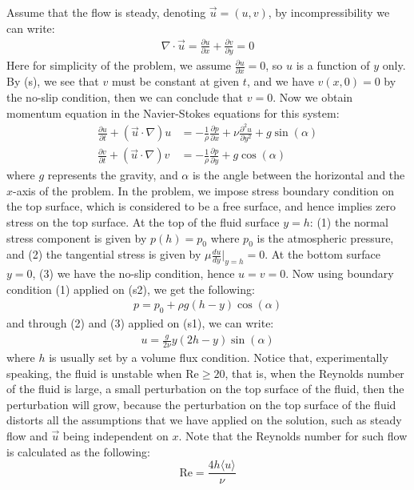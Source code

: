 \documentclass[11pt]{book}
\theoremstyle{break}
\theoremstyle{break}
\begin{document}
Assume that the flow is steady, denoting $\vec{u}=(u,v)$, by incompressibility we can write:
\begin{align*}
\nabla \cdot \vec{u} = \frac{\partial u}{\partial x} + \frac{\partial v}{\partial y}= 0 \tag{s}
\end{align*}
Here for simplicity of the problem, we assume $\frac{\partial u}{\partial x} = 0$, so $u$ is a function of $y$ only. By (s), we see that $v$ must be constant at given $t$, and we have $v(x,0)=0$ by the no-slip condition, then we can conclude that $v = 0$. Now we obtain momentum equation in the Navier-Stokes equations for this system:
\begin{align*}
\frac{\partial u}{\partial t} + (\vec{u} \cdot \nabla) u &= -\frac{1}{\rho} \frac{\partial p}{\partial x} + \nu\frac{\partial^2 u}{\partial y^2} + g\sin(\alpha) \tag{s1}\\
\frac{\partial v}{\partial t} + (\vec{u} \cdot \nabla) v &= -\frac{1}{\rho} \frac{\partial p}{\partial y}  + g\cos(\alpha) \tag{s2}
\end{align*}
where $g$ represents the gravity, and $\alpha$ is the angle between the horizontal and the $x$-axis of the problem. In the problem, we impose stress boundary condition on the top surface, which is considered to be a free surface, and hence implies zero stress on the top surface. At the top of the fluid surface $y = h$: (1) the normal stress component is given by $p(h) = p_0$ where $p_0$ is the atmospheric pressure, and (2) the tangential stress is given by $\mu \frac{du}{dy}|_{y=h} = 0$. At the bottom surface $y=0$, (3) we have the no-slip condition, hence $u = v = 0$. Now using boundary condition (1) applied on (s2), we get the following:
\begin{align*}
p = p_0 + \rho g(h-y)\cos(\alpha)
\end{align*}
and through (2) and (3) applied on (s1), we can write:
\begin{align*}
u = \frac{g}{2\nu} y(2h-y)\sin(\alpha)
\end{align*}
where $h$ is usually set by a volume flux condition. Notice that, experimentally speaking, the fluid is unstable when $\text{Re} \geq 20$, that is, when the Reynolds number of the fluid is large, a small perturbation on the top surface of the fluid, then the perturbation will grow, because the perturbation on the top surface of the fluid distorts all the assumptions that we have applied on the solution, such as steady flow and $\vec{u}$ being independent on $x$. Note that the Reynolds number for such flow is calculated as the following:
$$\text{Re}= \frac{4h\langle u\rangle}{\nu}$$
\end{document}
